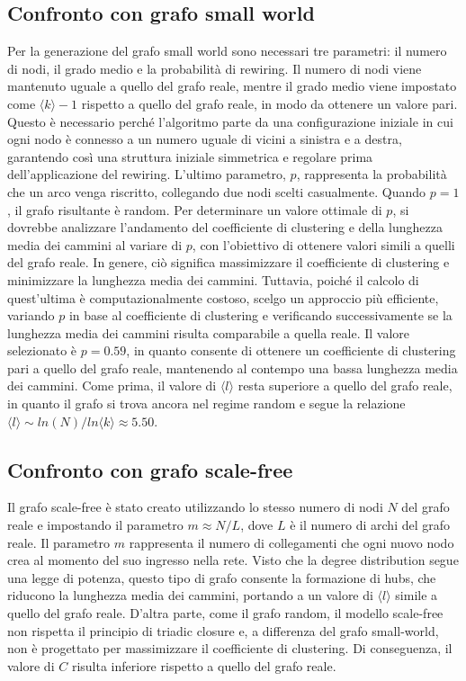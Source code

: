 \documentclass[sigchi]{acmart}
\begin{document}
\subsection{Confronto con grafo small world}
Per la generazione del grafo small world \cite{watts1998collective} sono necessari tre parametri: il numero di nodi, il grado medio e la probabilità di rewiring. Il numero di nodi viene mantenuto uguale a quello del grafo reale, mentre il grado medio viene impostato come $\langle k \rangle - 1$ rispetto a quello del grafo reale, in modo da ottenere un valore pari. Questo è necessario perché l'algoritmo parte da una configurazione iniziale in cui ogni nodo è connesso a un numero uguale di vicini a sinistra e a destra, garantendo così una struttura iniziale simmetrica e regolare prima dell'applicazione del rewiring. L'ultimo parametro, $p$, rappresenta la probabilità che un arco venga riscritto, collegando due nodi scelti casualmente. Quando $p=1$, il grafo risultante è random. Per determinare un valore ottimale di $p$, si dovrebbe analizzare l'andamento del coefficiente di clustering e della lunghezza media dei cammini al variare di $p$, con l'obiettivo di ottenere valori simili a quelli del grafo reale. In genere, ciò significa massimizzare il coefficiente di clustering e minimizzare la lunghezza media dei cammini. Tuttavia, poiché il calcolo di quest'ultima è computazionalmente costoso, scelgo un approccio più efficiente, variando $p$ in base al coefficiente di clustering e verificando successivamente se la lunghezza media dei cammini risulta comparabile a quella reale. Il valore selezionato è $p=0.59$, in quanto consente di ottenere un coefficiente di clustering pari a quello del grafo reale, mantenendo al contempo una bassa lunghezza media dei cammini. Come prima, il valore di $\langle l \rangle$ resta superiore a quello del grafo reale, in quanto il grafo si trova ancora nel regime random e segue la relazione $\langle l \rangle \sim ln(N)/ln\langle k \rangle \approx 5.50$. 

\subsection{Confronto con grafo scale-free}
Il grafo scale-free \cite{barabasi1999emergence} è stato creato utilizzando lo stesso numero di nodi $N$ del grafo reale e impostando il parametro $m\approx N/L$, dove $L$ è il numero di archi del grafo reale. Il parametro $m$ rappresenta il numero di collegamenti che ogni nuovo nodo crea al momento del suo ingresso nella rete. Visto che la degree distribution segue una legge di potenza, questo tipo di grafo consente la formazione di hubs, che riducono la lunghezza media dei cammini, portando a un valore di $\langle l \rangle$ simile a quello del grafo reale. D'altra parte, come il grafo random, il modello scale-free non rispetta il principio di triadic closure e, a differenza del grafo small-world, non è progettato per massimizzare il coefficiente di clustering. Di conseguenza, il valore di $C$ risulta inferiore rispetto a quello del grafo reale.
\end{document}
